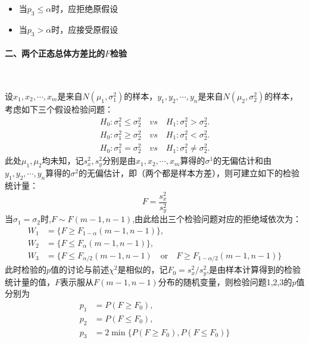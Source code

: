 \begin{itemize}
    \item 当$p_3 \leq \alpha$时，应拒绝原假设
    \item 当$p_3 > \alpha$时，应接受原假设
\end{itemize}

\paragraph{二、两个正态总体方差比的$F$检验}~{}

设$x_{1},x_{2},\cdots,x_{m}$是来自$N(\mu_1,\sigma_1^2)$的样本，$y_{1},y_{2},\cdots,y_{n}$是来自$N(\mu_2,\sigma_2^2)$的样本，考虑如下三个假设检验问题：
\begin{align}
    H_{0}:\sigma_{1}^{2} \leq \sigma_{2}^{2} \quad vs \quad H_{1}:\sigma_{1}^{2}>\sigma_{2}^{2}. \\
    H_{0}:\sigma_{1}^{2} \geq \sigma_{2}^{2} \quad vs \quad H_{1}:\sigma_{1}^{2}<\sigma_{2}^{2}. \\
    H_{0}:\sigma_{1}^{2}=\sigma_{2}^{2} \quad vs \quad H_{1}:\sigma_{1}^{2}\neq\sigma_{2}^{2}.
\end{align}
此处$\mu_1,\mu_2$均未知，记$s_x^2,s_y^2$分别是由$x_1,x_2,\cdots,x_m$算得的$\sigma^1$的无偏估计和由$y_1,y_2,\cdots,y_n$算得的$\sigma^2$的无偏估计，即（两个都是样本方差），则可建立如下的检验统计量：
\begin{equation}
    F = \frac{s_x^2}{s_y^2}
\end{equation}
当$\sigma_1=\sigma_2$时,$F\sim F(m-1,n-1)$,由此给出三个检验问题对应的拒绝域依次为：
$$
    \begin{aligned}
        W_{1} & =\{F\geq F_{1-\alpha}(m-1,n-1)\},                                                 \\
        W_{2} & =\{F\leq F_{\alpha}(m-1,n-1)\},                                                   \\
        W_{3} & =\{F\leq F_{\alpha/2}(m-1,n-1)\quad\text{or}\quad F\geq F_{1-\alpha/2}(m-1,n-1)\}
    \end{aligned}
$$
此时检验的$p$值的讨论与前述$\chi^2$是相似的，记$F_0=s_x^2/s_y^2$,是由样本计算得到的检验统计量的值，$F$表示服从$F(m-1,n-1)$分布的随机变量，则检验问题1,2,3的$p$值分别为
$$
    \begin{aligned}
        p_1 & =P(F\geq F_0),                      \\
        p_2 & =P(F\leq F_0),                      \\
        p_3 & =2\min\{P(F\geq F_0),P(F\leq F_0)\}
    \end{aligned}
$$


